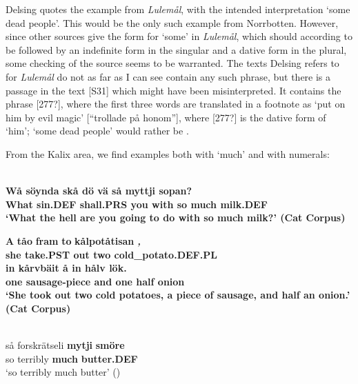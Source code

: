 Delsing quotes the example from \textit{Lulemål}, with the intended interpretation ‘some dead people’. This would be the only such example from Norrbotten. However, since other sources give the form  for ‘some’ in \textit{Lulemål}, which should according to \citet{Nordström1925} be followed by an indefinite form in the singular and a dative form in the plural, some checking of the source seems to be warranted. The texts Delsing refers to for \textit{Lulemål} do not as far as I can see contain any such phrase, but there is a passage in the text [S31] which might have been misinterpreted. It contains the phrase [277?], where the first three words are translated in a footnote as ‘put on him by evil magic’ [“trollade på honom”], where [277?] is the dative form of ‘him’; ‘some dead people’ would rather be . 

From the Kalix area, we find examples both with ‘much’ and with numerals:

\ea\label{}
\\
\gll \bfseries Wå  söynda  skå  dö  vä  så  myttji  sopan?\\
\bfseries What  sin.DEF  shall.PRS  you  with  so  much  milk.DEF\\
\glt ‘What the hell are you going to do with so \textbf{much milk}?’ (Cat Corpus)

\z

\ea
\gll \textbf{A} \textbf{tåo} \textbf{fram} \textbf{to} \textbf{\textit{  }} \textbf{kålpotåtisan} \textbf{\textit{,}}\\
\bfseries
she  take.PST  out  two  cold\_potato.DEF.PL\\
\gll in  kårvbäit  å  in  hålv  lök.\\
one  sausage-piece  and  one  half  onion\\
\glt ‘She took out two cold potatoes, a piece of sausage, and half an onion.’ (Cat Corpus)

\z

\ea \label{} 
\\
\gll så  forskrätseli  \textbf{mytji} \textbf{smöre}\\
so  terribly  \textbf{much} \textbf{butter.DEF}\\
\glt ‘so terribly much butter’ (\citet{Stenberg1971})


